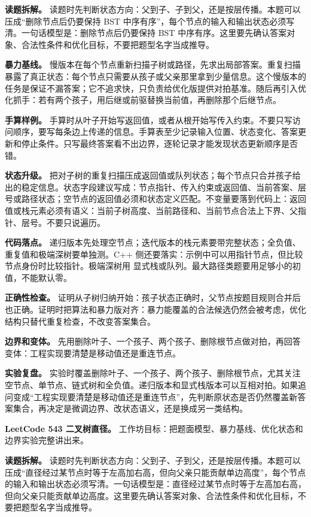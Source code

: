 \textbf{读题拆解。} 读题时先判断状态方向：父到子、子到父，还是按层传播。本题可以压成“删除节点后仍要保持 BST 中序有序”，每个节点的输入和输出状态必须写清。一句话模型是：删除节点后仍要保持 BST 中序有序。这里要先确认答案对象、合法性条件和优化目标，不要把题型名字当成推导。

\textbf{暴力基线。} 慢版本在每个节点重新扫描子树或路径，先求出局部答案。重复扫描暴露了真正状态：每个节点只需要从孩子或父亲那里拿到少量信息。这个慢版本的任务是保证不漏答案；它不追求快，只负责给优化版提供对拍基准。随后再引入优化抓手：若有两个孩子，用后继或前驱替换当前值，再删除那个后继节点。

\textbf{手算样例。} 手算时从叶子开始写返回值，或者从根开始写传入约束。不要只写访问顺序，要写每条边上传递的信息。手算表至少记录输入位置、状态变化、答案更新和停止条件。只写最终答案看不出边界，逐轮记录才能发现状态更新顺序是否错。

\textbf{状态升级。} 把对子树的重复扫描压成返回值或队列状态；每个节点只合并孩子给出的稳定信息。状态字段建议写成：节点指针、传入约束或返回值、当前答案、层号或路径状态；空节点的返回值必须和状态定义匹配。不变量要落到代码上：返回值或栈元素必须有语义：当前子树高度、当前路径和、当前节点合法上下界、父指针、层号。不要只说遍历。

\textbf{代码落点。} 递归版本先处理空节点；迭代版本的栈元素要带完整状态；全负值、重复值和极端深树要单独测。C++ 侧还要落实：示例中可以用指针节点，但比较节点身份时比较指针。极端深树用  显式栈或队列。最大路径类题要用足够小的初值，不能默认零。

\textbf{正确性检查。} 证明从子树归纳开始：孩子状态正确时，父节点按题目规则合并后也正确。证明时把算法和暴力版对齐：暴力能覆盖的合法候选仍然会被考虑，优化结构只替代重复检查，不改变答案集合。

\textbf{边界和变体。} 先用删除叶子、一个孩子、两个孩子、删除根节点做对拍，再回答变体：工程实现要清楚是移动值还是重连节点。

\textbf{实验复盘。} 实验时覆盖删除叶子、一个孩子、两个孩子、删除根节点，尤其关注空节点、单节点、链式树和全负值。递归版本和显式栈版本可以互相对拍。如果追问变成“工程实现要清楚是移动值还是重连节点”，先判断原状态是否仍然覆盖新答案集合，再决定是微调边界、改状态语义，还是换成另一类结构。

\noindent\textbf{LeetCode 543 二叉树直径。} 工作坊目标：把题面模型、暴力基线、优化状态和边界实验完整讲出来。

\textbf{读题拆解。} 读题时先判断状态方向：父到子、子到父，还是按层传播。本题可以压成“直径经过某节点时等于左高加右高，但向父亲只能贡献单边高度”，每个节点的输入和输出状态必须写清。一句话模型是：直径经过某节点时等于左高加右高，但向父亲只能贡献单边高度。这里要先确认答案对象、合法性条件和优化目标，不要把题型名字当成推导。


